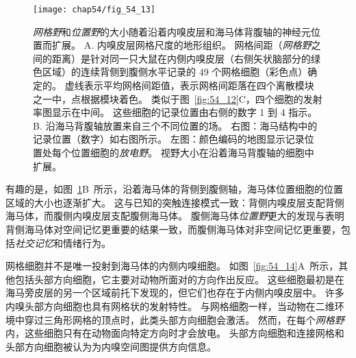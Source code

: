 \begin{figure}[htbp]
	\centering
	\texttt{[image: chap54/fig\_54\_13]}
	\caption{\textit{网格野}和\textit{位置野}的大小随着沿着内嗅皮层和海马体背腹轴的神经元位置而扩展。
		A. 内嗅皮层网格尺度的地形组织。
		网格间距（\textit{网格野}之间的距离）是针对同一只大鼠在内侧内嗅皮层（右侧矢状脑部分的绿色区域）的连续背侧到腹侧水平记录的 49 个网格细胞（彩色点）确定的。
		虚线表示平均网格间距值，表示网格间距落在四个离散模块之一中，点根据模块着色。
		类似于图~\ref{fig:54_12}C，四个细胞的发射率图显示在中间。
		这些细胞的记录位置由右侧的数字 1 到 4 指示\cite{stensola2012entorhinal}。
		B. 沿海马背腹轴放置来自三个不同位置的场。
		右图：海马结构中的记录位置（数字）如右图所示。
		左图：颜色编码的地图显示记录位置处每个位置细胞的\textit{放电野}。
		视野大小在沿着海马背腹轴的细胞中扩展\cite{kjelstrup2008finite}。}
	\label{fig:54_13}
\end{figure}


有趣的是，如图~\ref{fig:54_13}B~所示，沿着海马体的背侧到腹侧轴，海马体位置细胞的位置区域的大小也逐渐扩大。
这与已知的突触连接模式一致：背侧内嗅皮层支配背侧海马体，而腹侧内嗅皮层支配腹侧海马体。
腹侧海马体\textit{位置野}更大的发现与表明背侧海马体对空间记忆更重要的结果一致，而腹侧海马体对非空间记忆更重要，包括\textit{社交记忆}和情绪行为。


网格细胞并不是唯一投射到海马体的内侧内嗅细胞。
如图~\ref{fig:54_14}A~所示，其他包括头部方向细胞，它主要对动物所面对的方向作出反应。
这些细胞最初是在海马旁皮层的另一个区域前托下发现的，但它们也存在于内侧内嗅皮层中。
许多内嗅头部方向细胞也具有网格状的发射特性。
与网格细胞一样，当动物在二维环境中穿过三角形网格的顶点时，此类头部方向细胞会激活。
然而，在每个\textit{网格野}内，这些细胞只有在动物面向特定方向时才会放电。
头部方向细胞和连接网格和头部方向细胞被认为为内嗅空间图提供方向信息。


